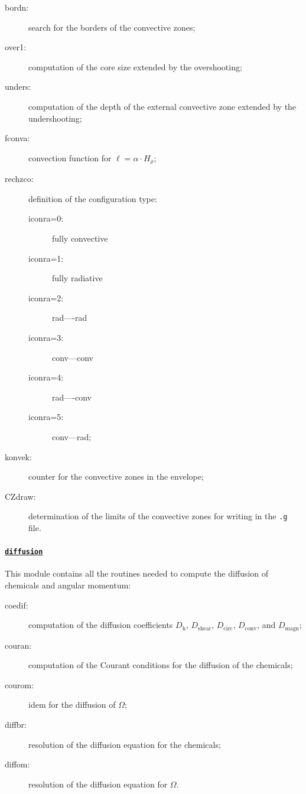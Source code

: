 \documentclass[11pt]{article}
\def\om{\ensuremath{\Omega}}
\begin{document}
\begin{description}
 \item[bordn:] search for the borders of the convective zones;
 \item[over1:] computation of the core size extended by the overshooting;
 \item[unders:] computation of the depth of the external convective zone extended by the undershooting;
 \item[fconva:] convection function for $\ell=\alpha\cdot H_\rho$;
 \item[rechzco:] definition of the configuration type:
   \begin{description}
     \item[iconra=0:] fully convective
     \item[iconra=1:] fully radiative
     \item[iconra=2:] rad----rad
     \item[iconra=3:] conv---conv
     \item[iconra=4:] rad----conv
     \item[iconra=5:] conv---rad;
  \end{description}
 \item[konvek:] counter for the convective zones in the envelope;
 \item[CZdraw:] determination of the limits of the convective zones for writing in the \texttt{.g} file.
\end{description}

\paragraph{\underline{\texttt{diffusion}}}
This module contains all the routines needed to compute the diffusion of chemicals and angular momentum:

\begin{description}
 \item[coedif:] computation of the diffusion coefficients $D_\text{h}$, $D_\text{shear}$, $D_\text{circ}$, $D_\text{conv}$, and $D_\text{magn}$;
 \item[couran:] computation of the Courant conditions for the diffusion of the chemicals;
 \item[courom:] idem for the diffusion of \om;
 \item[diffbr:] resolution of the diffusion equation for the chemicals;
 \item[diffom:] resolution of the diffusion equation for \om.
 \end{description}
\end{document}

